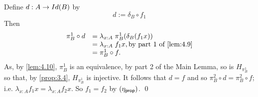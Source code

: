 Define $d:A\rightarrow Id(B)$ by
  \[ d:=\delta_B\circ f_1\]
Then
  \[\begin{array}{ll}
\pi^1_B\circ d &=\lambda_{x:A}\;\pi^1_B(\delta_B(f_1x))\\
              &=\lambda_{x:A}\; f_1x, \mbox{by part 1 of \autoref{lem:4.9}}\\
              &=\pi^1_B\circ f.
  \end{array}\]
As, by \autoref{lem:4.10},
 $\pi^1_B$ is an equivalence, by part 2 of the Main Lemma, so is $H_{\pi^1_B}$ so that, by \autoref{prop:3.4},
$H_{\pi^1_B}$ is injective.  It follows that  $d=f$ and so 
$\pi^2_B\circ d =\pi^2_B\circ f$; i.e. $\lambda_{x:A}f_1x =\lambda_{x:A}f_2x$.
So $f_1=f_2$ by $(\eta_{\sf prop})$.
\qed



